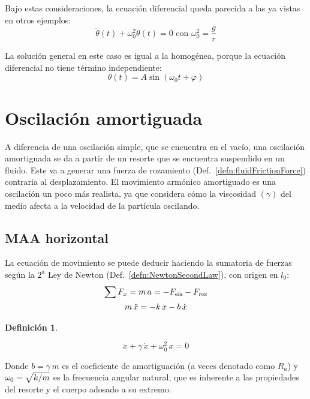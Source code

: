 \documentclass[a5paper,12pt,twoside]{book}
\newtheorem{defn}{{Definición}}[chapter]
\begin{document}
Bajo estas consideraciones, la ecuación diferencial queda parecida a las ya vistas en otros ejemplos:
\[ \ddot{\theta} (t) + \omega_0^2 \theta (t) = 0 \text{ con } \omega_0^2 = \frac{g}{r}\]

La solución general en este caso es igual a la homogénea, porque la ecuación diferencial no tiene término independiente:
\[ \theta(t) = A \sin(\omega_0 t + \varphi) \]


\section{Oscilación amortiguada}
A diferencia de una oscilación simple, que se encuentra en el vacío, una oscilación amortiguada se da a partir de un resorte que se encuentra suspendido en un fluido. Este va a generar una fuerza de rozamiento (Def.\ \ref{defn:fluidFrictionForce}) contraria al desplazamiento. El movimiento armónico amortiguado es una oscilación un poco más realista, ya que considera cómo la viscosidad $(\gamma)$ del medio afecta a la velocidad de la partícula oscilando. 


\subsection{MAA horizontal}

La ecuación de movimiento se puede deducir haciendo la sumatoria de fuerzas según la $2^{\text{a}}$ Ley de Newton (Def.\ \ref{defn:NewtonSecondLaw}), con origen en $l_0$:
\begin{gather*}
    \sum F_x = m \, a = - {{F}_\textsl{{ela}}} - {{F}_\textsl{{roz}}}
    \\
    m \, \ddot{x} = - k \, x - b \, \dot{x}
\end{gather*}

\begin{mdframed}[style=MyFrame1]
    \begin{defn}
    \end{defn}
    \begin{equation*}
        \ddot{x} + \gamma \, \dot{x} + \omega_0^2 \, x  = 0
    \end{equation*}
\end{mdframed}

Donde $b=\gamma \, m$ es el coeficiente de amortiguación (a veces denotado como $R_a$) y $\omega_0=\sqrt{k/m}$ es la frecuencia angular natural, que es inherente a las propiedades del resorte y el cuerpo adosado a su extremo.
\end{document}
